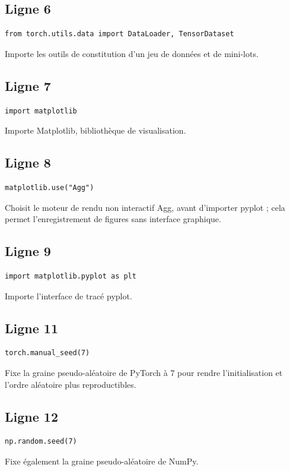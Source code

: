 \documentclass[11pt,a4paper]{article}
\begin{document}
\subsection*{Ligne 6}
\begin{lstlisting}
from torch.utils.data import DataLoader, TensorDataset
\end{lstlisting}
Importe les outils de constitution d'un jeu de données et de mini-lots.

\subsection*{Ligne 7}
\begin{lstlisting}
import matplotlib
\end{lstlisting}
Importe Matplotlib, bibliothèque de visualisation.

\subsection*{Ligne 8}
\begin{lstlisting}
matplotlib.use("Agg")
\end{lstlisting}
Choisit le moteur de rendu non interactif Agg, avant d'importer pyplot ; cela permet l'enregistrement de figures sans interface graphique.

\subsection*{Ligne 9}
\begin{lstlisting}
import matplotlib.pyplot as plt
\end{lstlisting}
Importe l'interface de tracé pyplot.

\subsection*{Ligne 11}
\begin{lstlisting}
torch.manual_seed(7)
\end{lstlisting}
Fixe la graine pseudo-aléatoire de PyTorch à 7 pour rendre l'initialisation et l'ordre aléatoire plus reproductibles.

\subsection*{Ligne 12}
\begin{lstlisting}
np.random.seed(7)
\end{lstlisting}
Fixe également la graine pseudo-aléatoire de NumPy.
\end{document}
